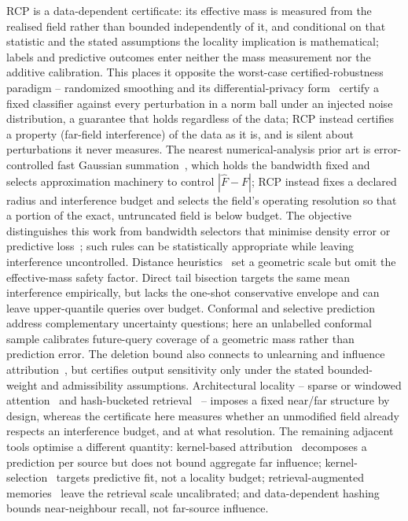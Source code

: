 \documentclass[10pt,twocolumn]{article}
\begin{document}
RCP is a data-dependent certificate: its effective mass is measured from the realised field rather than bounded independently of it, and conditional on that statistic and the stated assumptions the locality implication is mathematical; labels and predictive outcomes enter neither the mass measurement nor the additive calibration. This places it opposite the worst-case certified-robustness paradigm -- randomized smoothing and its differential-privacy form~\cite{cohen2019,lecuyer2019} certify a fixed classifier against every perturbation in a norm ball under an injected noise distribution, a guarantee that holds regardless of the data; RCP instead certifies a property (far-field interference) of the data as it is, and is silent about perturbations it never measures. The nearest numerical-analysis prior art is error-controlled fast Gaussian summation~\cite{greengard1991,yang2003,morariu2008}, which holds the bandwidth fixed and selects approximation machinery to control $|\widehat F-F|$; RCP instead fixes a declared radius and interference budget and selects the field's operating resolution so that a portion of the exact, untruncated field is below budget. The objective distinguishes this work from bandwidth selectors that minimise density error or predictive loss~\cite{silverman1986,scott1992,sheather1991,botev2010,gpml}; such rules can be statistically appropriate while leaving interference uncontrolled. Distance heuristics~\cite{garreau2017,zelnikmanor2004} set a geometric scale but omit the effective-mass safety factor. Direct tail bisection targets the same mean interference empirically, but lacks the one-shot conservative envelope and can leave upper-quantile queries over budget. Conformal and selective prediction~\cite{vovk2005,angelopoulos2023,geifman2017} address complementary uncertainty questions; here an unlabelled conformal sample calibrates future-query coverage of a geometric mass rather than prediction error. The deletion bound also connects to unlearning and influence attribution~\cite{ginart2019,koh2017}, but certifies output sensitivity only under the stated bounded-weight and admissibility assumptions. Architectural locality -- sparse or windowed attention~\cite{child2019,beltagy2020} and hash-bucketed retrieval~\cite{kitaev2020,andoni2008} -- imposes a fixed near/far structure by design, whereas the certificate here measures whether an unmodified field already respects an interference budget, and at what resolution. The remaining adjacent tools optimise a different quantity: kernel-based attribution~\cite{yeh2018} decomposes a prediction per source but does not bound aggregate far influence; kernel-selection~\cite{gonen2011} targets predictive fit, not a locality budget; retrieval-augmented memories~\cite{khandelwal2020} leave the retrieval scale uncalibrated; and data-dependent hashing~\cite{andoni2015} bounds near-neighbour recall, not far-source influence.
\end{document}
